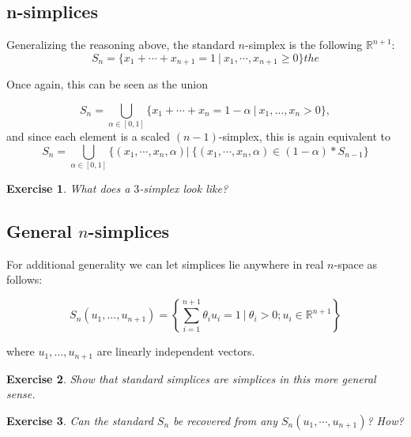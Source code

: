 \documentclass{tufte-handout}
\newtheorem{exercise}{Exercise}
\newcommand{\re}{\mathbb{R}}
\begin{document}
\subsection{n-simplices}
Generalizing the reasoning above, the standard $n$-simplex is the following $\re^{n+1}$:
\begin{equation}
    S_n = \{x_1 + \cdots + x_{n+1} = 1\ |\  x_1, \cdots, x_{n+1} \geq 0 \}the 
    \label{standard-simplex}
\end{equation}

Once again, this can be seen as the union

\begin{equation}
  S_n =  \bigcup_{\alpha \in [0,1]} \{x_1+\cdots+x_n = 1-\alpha\ |\ x_1,\ldots,x_n>0\},
\end{equation}
and since each element is a scaled $(n-1)$-simplex, this is again equivalent to 
\begin{equation}
    S_n = \bigcup_{\alpha\in[0,1]} \{(x_1,\cdots,x_n,\alpha) | \ \{(x_1,\cdots,x_n,\alpha)\in (1-\alpha)*S_{n-1}  \}
\end{equation}
\begin{exercise}
What does a $3$-simplex look like?
\end{exercise}
\subsection{General $n$-simplices}
For additional generality we can let simplices lie anywhere in real $n$-space as follows:

\begin{equation}
    S_{n}(u_1,\ldots,u_{n+1}) = \left\{\sum_{i=1}^{n+1} \theta_i u_i = 1\ |\  \theta_i>0; u_i\in \re^{n+1} \right\}
    \label{geometric-simplex}
\end{equation}

where $u_1,\ldots,u_{n+1}$ are linearly independent vectors. 

\begin{exercise}
Show that standard simplices are simplices in this more general sense.
\end{exercise}
\begin{exercise}
Can the standard $S_n$ be recovered from any $S_n(u_1,\cdots,u_{n+1})$? How?
\end{exercise}
\end{document}
